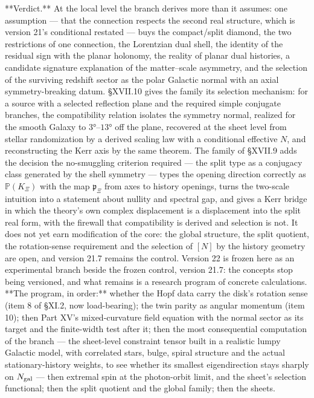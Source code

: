 **Verdict.** At the local level the branch derives more than it assumes: one assumption — that the connection respects the second real structure, which is version 21's conditional restated — buys the compact/split diamond, the two restrictions of one connection, the Lorentzian dual shell, the identity of the residual sign with the planar holonomy, the reality of planar dual histories, a candidate signature explanation of the matter–scale asymmetry, and the selection of the surviving redshift sector as the polar Galactic normal with an axial symmetry-breaking datum. §XVII.10 gives the family its selection mechanism: for a source with a selected reflection plane and the required simple conjugate branches, the compatibility relation isolates the symmetry normal, realized for the smooth Galaxy to $3°$–$13°$ off the plane, recovered at the sheet level from stellar randomization by a derived scaling law with a conditional effective $N$, and reconstructing the Kerr axis by the same theorem. The family of §XVII.9 adds the decision the no-smuggling criterion required — the split type as a conjugacy class generated by the shell symmetry — types the opening direction correctly as $\mathbb P(K_\Xi)$ with the map $\mathfrak p_\Xi$ from axes to history openings, turns the two-scale intuition into a statement about nullity and spectral gap, and gives a Kerr bridge in which the theory's own complex displacement is a displacement into the split real form, with the firewall that compatibility is derived and selection is not. It does not yet earn modification of the core: the global structure, the split quotient, the rotation-sense requirement and the selection of $[N]$ by the history geometry are open, and version 21.7 remains the control. Version 22 is frozen here as an experimental branch beside the frozen control, version 21.7: the concepts stop being versioned, and what remains is a research program of concrete calculations. **The program, in order:** whether the Hopf data carry the disk's rotation sense (item 8 of §XI.2, now load-bearing); the twin parity as angular momentum (item 10); then Part XV's mixed-curvature field equation with the normal sector as its target and the finite-width test after it; then the most consequential computation of the branch — the sheet-level constraint tensor built in a realistic lumpy Galactic model, with correlated stars, bulge, spiral structure and the actual stationary-history weights, to see whether its smallest eigendirection stays sharply on $N_{\rm gal}$ — then extremal spin at the photon-orbit limit, and the sheet's selection functional; then the split quotient and the global family; then the sheets.

